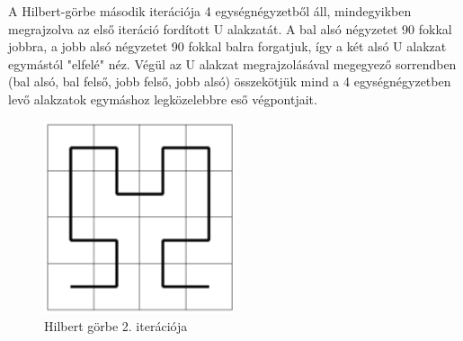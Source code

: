 A Hilbert-görbe második iterációja 4 egységnégyzetből áll, mindegyikben megrajzolva az első iteráció fordított U alakzatát. A bal alsó négyzetet 90 fokkal jobbra, a jobb alsó négyzetet 90 fokkal balra forgatjuk, így a két alsó U alakzat egymástól "elfelé" néz. Végül az U alakzat megrajzolásával megegyező sorrendben (bal alsó, bal felső, jobb felső, jobb alsó) összekötjük mind a 4 egységnégyzetben levő alakzatok egymáshoz legközelebbre eső végpontjait.
\begin{figure}[!ht]
	\begin{center}
	\includegraphics[width=0.5\textwidth]{img/HilbertCurve2-1}
	\caption[labelInTOC]{Hilbert görbe 2. iterációja}
\end{center}
\end{figure}
